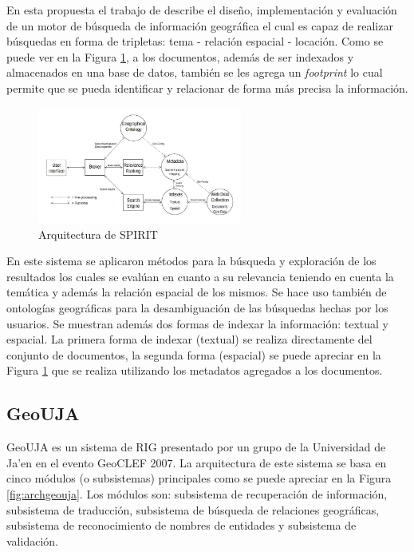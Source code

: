 \documentclass{llncs}
\begin{document}
En esta propuesta el trabajo de \cite{purves2007} describe el diseño,
implementación y evaluación de un motor de búsqueda de información geográfica
el cual es capaz de realizar búsquedas en forma de tripletas: tema - relación
espacial - locación. Como se puede ver en la Figura \ref{fig:archspirit}, a los
documentos, además de ser indexados y almacenados en una base de datos, también
se les agrega un \emph{footprint} lo cual permite que se pueda identificar y
relacionar de forma más precisa la información.

\begin{figure}[htb]%
	\begin{center}
		\includegraphics[width=0.6\textwidth]{spirit_arch.jpg}
	\end{center}
	\caption{Arquitectura de SPIRIT \cite{purves2007}}
	\label{fig:archspirit}
\end{figure}

En este sistema se aplicaron métodos para la búsqueda y exploración de los
resultados los cuales se evalúan en cuanto a su relevancia teniendo en cuenta
la temática y además la relación espacial de los mismos. Se hace uso también de
ontologías geográficas para la desambiguación de las búsquedas hechas por los
usuarios. Se muestran además dos formas de indexar la información: textual y
espacial. La primera forma de indexar (textual) se realiza directamente del
conjunto de documentos, la segunda forma (espacial) se puede apreciar en la
Figura \ref{fig:archspirit} que se realiza utilizando los metadatos agregados a
los documentos.

\subsection{GeoUJA}\label{sec:archgeouja}

GeoUJA \cite{perea2007} es un sistema de RIG presentado por un grupo de la
Universidad de Ja'en en el evento GeoCLEF 2007. La arquitectura de este sistema
se basa en cinco módulos (o subsistemas) principales como se puede apreciar en
la Figura \ref{fig:archgeouja}. Los módulos son: subsistema de recuperación de
información, subsistema de traducción, subsistema de búsqueda de relaciones
geográficas, subsistema de reconocimiento de nombres de entidades y subsistema
de validación.
\end{document}
